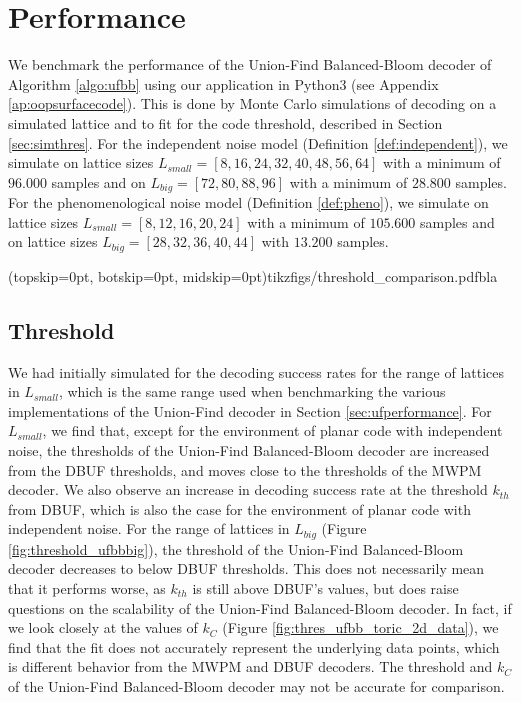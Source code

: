 \section{Performance}\label{sec:performance}


We benchmark the performance of the Union-Find Balanced-Bloom decoder of Algorithm \ref{algo:ufbb} using our application in Python3 (see Appendix \ref{ap:oopsurfacecode}). This is done by Monte Carlo simulations of decoding on a simulated lattice and to fit for the code threshold, described in Section \ref{sec:simthres}. For the independent noise model (Definition \ref{def:independent}), we simulate on lattice sizes $L_{small}=[8, 16, 24, 32, 40, 48, 56, 64]$ with a minimum of $96.000$ samples and on $L_{big}=[72, 80, 88, 96]$ with a minimum of $28.800$ samples. For the phenomenological noise model (Definition \ref{def:pheno}), we simulate on lattice sizes $L_{small}=[8,12,16,20,24]$ with a minimum of $105.600$ samples and on lattice sizes $L_{big}=[28, 32, 36, 40, 44]$ with $13.200$ samples. 

\Figure[htb](topskip=0pt, botskip=0pt, midskip=0pt){tikzfigs/threshold_comparison.pdf}{bla\label{thres_comp}}


\subsection{Threshold}

We had initially simulated for the decoding success rates for the range of lattices in $L_{small}$, which is the same range used when benchmarking the various implementations of the Union-Find decoder in Section \ref{sec:ufperformance}. For $L_{small}$, we find that, except for the environment of planar code with independent noise, the thresholds of the Union-Find Balanced-Bloom decoder are increased from the DBUF thresholds, and moves close to the thresholds of the MWPM decoder. We also observe an increase in decoding success rate at the threshold $k_{th}$ from DBUF, which is also the case for the environment of planar code with independent noise. For the range of lattices in $L_{big}$ (Figure \ref{fig:threshold_ufbbbig}), the threshold of the Union-Find Balanced-Bloom decoder decreases to below DBUF thresholds. This does not necessarily mean that it performs worse, as $k_{th}$ is still above DBUF's values, but does raise questions on the scalability of the Union-Find Balanced-Bloom decoder. In fact, if we look closely at the values of $k_C$ (Figure \ref{fig:thres_ufbb_toric_2d_data}), we find that the fit does not accurately represent the underlying data points, which is different behavior from the MWPM and DBUF decoders. The threshold and $k_C$ of the Union-Find Balanced-Bloom decoder may not be accurate for comparison. 

